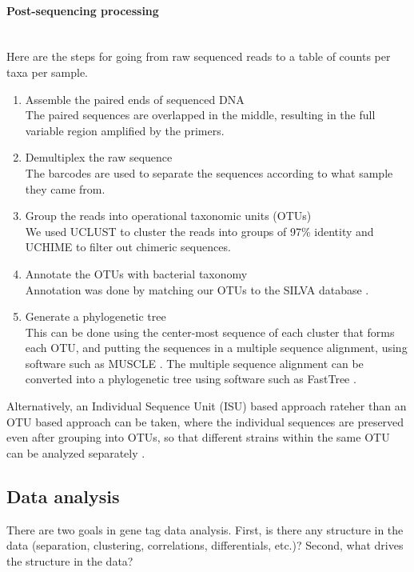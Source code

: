 \paragraph{Post-sequencing processing}\mbox{}\\
Here are the steps for going from raw sequenced reads to a table of counts per taxa per sample.
\begin{enumerate}
\item Assemble the paired ends of sequenced DNA\\
The paired sequences are overlapped in the middle, resulting in the full variable region amplified by the primers.

\item Demultiplex the raw sequence\\
The barcodes are used to separate the sequences according to what sample they came from.

\item Group the reads into operational taxonomic units (OTUs)\\
We used UCLUST \cite{edgar2010search} to cluster the reads into groups of 97\% identity and UCHIME \cite{edgar2011uchime} to filter out chimeric sequences.

\item Annotate the OTUs with bacterial taxonomy\\
Annotation was done by  matching our OTUs to the SILVA database \cite{quast2013silva}.

\item Generate a phylogenetic tree\\
This can be done using the center-most sequence of each cluster that forms each OTU, and putting the sequences in a multiple sequence alignment, using software such as MUSCLE \cite{edgar2004muscle}. The multiple sequence alignment can be converted into a phylogenetic tree using software such as FastTree \cite{price2010fasttree}.
\end{enumerate}

Alternatively, an Individual Sequence Unit (ISU) based approach rateher than an OTU based approach can be taken, where the individual sequences are preserved even after grouping into OTUs, so that different strains within the same OTU can be analyzed separately \cite{callahan2015dada2}.

\FloatBarrier

\subsection{Data analysis}
There are two goals in gene tag data analysis. First, is there any structure in the data (separation, clustering, correlations, differentials, etc.)? Second, what drives the structure in the data?

